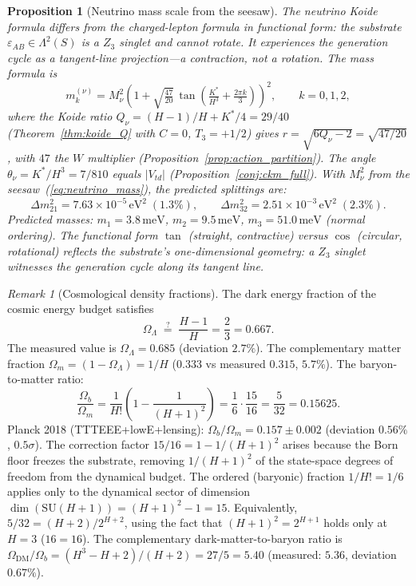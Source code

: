 \documentclass[11pt,a4paper]{article}
\newtheorem{proposition}[theorem]{Proposition}
\theoremstyle{definition}
\theoremstyle{remark}
\newtheorem{remark}[theorem]{Remark}
\newcommand{\SU}{\mathrm{SU}}
\begin{document}
\begin{proposition}[Neutrino mass scale from the seesaw]
The neutrino Koide formula differs from the charged-lepton formula in functional form: the substrate $\varepsilon_{AB}\in\Lambda^2(S)$ is a $Z_3$ singlet and cannot rotate. It experiences the generation cycle as a tangent-line projection---a contraction, not a rotation. The mass formula is
\begin{equation}\label{eq:neutrino_koide}
m_k^{(\nu)} = M_\nu^2\!\left(1+\sqrt{\tfrac{47}{20}}\,\tan\!\left(\tfrac{K^*}{H^3}+\tfrac{2\pi k}{3}\right)\right)^{\!2}, \qquad k=0,1,2,
\end{equation}
where the Koide ratio $Q_\nu=(H\!-\!1)/H+K^*/4=29/40$ (Theorem~\ref{thm:koide_Q} with $C=0$, $T_3=+1/2$) gives $r=\sqrt{6Q_\nu-2}=\sqrt{47/20}$, with $47$ the $W$ multiplier (Proposition~\ref{prop:action_partition}). The angle $\theta_\nu=K^*/H^3=7/810$ equals $|V_{td}|$ (Proposition~\ref{conj:ckm_full}). With $M_\nu^2$ from the seesaw~(\ref{eq:neutrino_mass}), the predicted splittings are:
\[
\Delta m^2_{21}=7.63\times 10^{-5}\,\mathrm{eV}^2\;(1.3\%),\qquad \Delta m^2_{32}=2.51\times 10^{-3}\,\mathrm{eV}^2\;(2.3\%).
\]
Predicted masses: $m_1=3.8\,\mathrm{meV}$, $m_2=9.5\,\mathrm{meV}$, $m_3=51.0\,\mathrm{meV}$ (normal ordering). The functional form $\tan$ (straight, contractive) versus $\cos$ (circular, rotational) reflects the substrate's one-dimensional geometry: a $Z_3$ singlet witnesses the generation cycle along its tangent line.
\end{proposition}

\begin{remark}[Cosmological density fractions]\label{rem:cosmological_fractions}
The dark energy fraction of the cosmic energy budget satisfies
\begin{equation}\label{eq:omega_lambda}
\Omega_\Lambda \;\stackrel{?}{=}\; \frac{H-1}{H} = \frac{2}{3} = 0.667.
\end{equation}
The measured value is $\Omega_\Lambda=0.685$ (deviation $2.7\%$). The complementary matter fraction $\Omega_m=(1-\Omega_\Lambda)=1/H$ ($0.333$ vs measured $0.315$, $5.7\%$). The baryon-to-matter ratio:
\begin{equation}\label{eq:omega_baryon}
\frac{\Omega_b}{\Omega_m}=\frac{1}{H!}\!\left(1-\frac{1}{(H+1)^2}\right)=\frac{1}{6}\cdot\frac{15}{16}=\frac{5}{32}=0.15625.
\end{equation}
Planck 2018 (TTTEEE+lowE+lensing): $\Omega_b/\Omega_m=0.157\pm 0.002$ (deviation $0.56\%$, $0.5\sigma$). The correction factor $15/16=1-1/(H+1)^2$ arises because the Born floor freezes the substrate, removing $1/(H+1)^2$ of the state-space degrees of freedom from the dynamical budget. The ordered (baryonic) fraction $1/H!=1/6$ applies only to the dynamical sector of dimension $\dim(\SU(H+1))=(H+1)^2-1=15$. Equivalently, $5/32=(H+2)/2^{H+2}$, using the fact that $(H+1)^2=2^{H+1}$ holds only at $H=3$ ($16=16$). The complementary dark-matter-to-baryon ratio is $\Omega_{\mathrm{DM}}/\Omega_b=(H^3-H+2)/(H+2)=27/5=5.40$ (measured: $5.36$, deviation $0.67\%$).
\end{remark}
\end{document}
